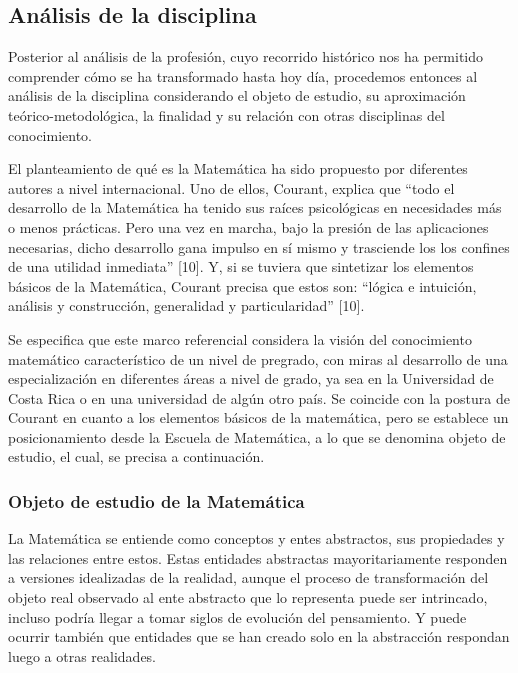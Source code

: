 \subsection{Análisis de la disciplina}

Posterior al análisis de la profesión, cuyo recorrido histórico nos ha permitido comprender cómo se ha transformado hasta hoy día, procedemos entonces al análisis de la disciplina considerando el objeto de estudio, su aproximación teórico-metodológica, la finalidad y su relación con otras disciplinas del conocimiento.

El planteamiento de qué es la Matemática ha sido propuesto por diferentes autores a nivel internacional. Uno de ellos, Courant, explica que “todo el desarrollo de la Matemática ha tenido sus raíces psicológicas en necesidades más o menos prácticas. Pero una vez en marcha, bajo la presión de las aplicaciones necesarias, dicho desarrollo gana impulso en sí mismo y trasciende los los confines de una utilidad inmediata” [10]. Y, si se tuviera que sintetizar los elementos básicos de la Matemática, Courant precisa que estos son: “lógica e intuición, análisis y construcción, generalidad y particularidad” [10].

Se especifica que este marco referencial considera la visión del conocimiento matemático característico de un nivel de pregrado, con miras al desarrollo de una especialización en diferentes áreas a nivel de grado, ya sea en la Universidad de Costa Rica o en una universidad de algún otro país. Se coincide con la postura de Courant en cuanto a los elementos básicos de la matemática, pero se establece un posicionamiento desde la Escuela de Matemática, a lo que se denomina objeto de estudio, el cual, se precisa a continuación. 

\subsubsection{Objeto de estudio de la Matemática}

La Matemática se entiende como conceptos y entes abstractos, sus propiedades y las relaciones entre estos. Estas entidades abstractas mayoritariamente responden  a versiones idealizadas de la realidad, aunque el proceso de transformación del objeto real observado al ente abstracto que lo representa puede ser intrincado, incluso podría llegar a tomar siglos de evolución del pensamiento. Y puede ocurrir también que entidades que se han creado solo en la abstracción respondan luego a otras realidades. 

